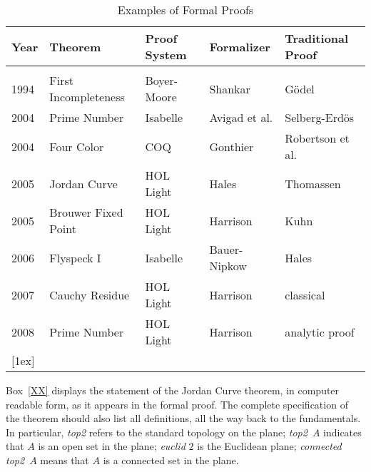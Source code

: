 \documentclass{llncs}
\begin{document}
\smallskip

\begin{table}[ht]
\caption{Examples of Formal Proofs}
\centering
\begin{tabular}{l l l l l}
\hline
Year\hspace{0.5em} & Theorem\hspace{6em} & Proof System\hspace{2em}  & Formalizer\hspace{3em} & Traditional Proof\\ [0.5ex]
\hline \\
1994 & First Incompleteness & Boyer-Moore   & Shankar &  G\"odel \\
2004 & Prime Number & Isabelle & Avigad et al. & Selberg-Erd\"os\\
2004 & Four Color & COQ & Gonthier & Robertson et al.\\
2005 & Jordan Curve  & HOL Light & Hales & Thomassen \\
2005 & Brouwer Fixed Point & HOL Light & Harrison & Kuhn \\
2006 & Flyspeck I & Isabelle & Bauer-Nipkow & Hales \\
2007 & Cauchy Residue & HOL Light & Harrison & classical \\
2008 & Prime Number & HOL Light & Harrison & analytic proof \\
 [1ex]
\hline
\end{tabular}
\label{table}
\end{table}


Box~\ref{XX} displays the statement of the Jordan Curve theorem, in computer
readable form, as it appears in the formal
proof.  The complete specification of the theorem should also list
all definitions, all the way back to the fundamentals.  In particular, {\it top2} refers
to the standard topology on the plane; {\it top2}~$A$ indicates that $A$ is an open set
in the plane;  {\it euclid} $2$ is the Euclidean plane; {\it connected top2}~$A$ means that
$A$ is a connected set in the plane.

\bigskip
\noindent
{}
\medskip
\end{document}
